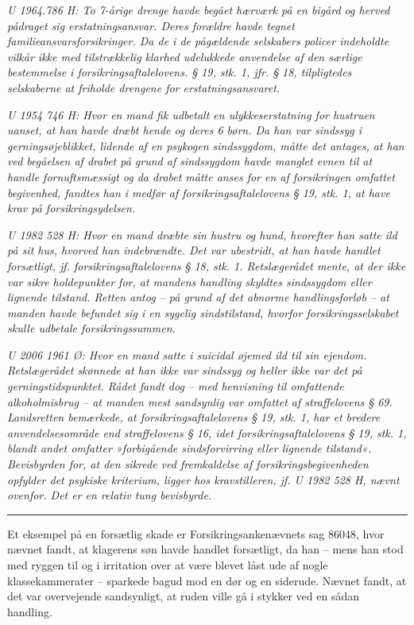 \documentclass[]{book}
\begin{document}
\emph{U 1964.786 H: To 7-årige drenge havde begået hærværk på en bigård og herved pådraget sig erstatningsansvar. Deres forældre havde tegnet familieansvarsforsikringer. Da de i de pågældende selskabers policer indeholdte vilkår ikke med tilstrækkelig klarhed udelukkede anvendelse af den særlige bestemmelse i forsikringsaftalelovens. § 19, stk. 1, jfr. § 18, tilpligtedes selskaberne at friholde drengene for erstatningsansvaret.}

\emph{U 1954 746 H: Hvor en mand fik udbetalt en ulykkeserstatning for hustruen uanset, at han havde dræbt hende og deres 6 børn. Da han var sindssyg i gerningsøjeblikket, lidende af en psykogen sindssygdom, måtte det antages, at han ved begåelsen af drabet på grund af sindssygdom havde manglet evnen til at handle fornuftsmæssigt og da drabet måtte anses for en af forsikringen omfattet begivenhed, fandtes han i medfør af forsikringsaftalelovens § 19, stk. 1, at have krav på forsikringsydelsen.}

\emph{U 1982 528 H: Hvor en mand dræbte sin hustru og hund, hvorefter han satte ild på sit hus, hvorved han indebrændte. Det var ubestridt, at han havde handlet forsætligt, jf. forsikringsaftalelovens § 18, stk. 1. Retslægerådet mente, at der ikke var sikre holdepunkter for, at mandens handling skyldtes sindssygdom eller lignende tilstand. Retten antog -- på grund af det abnorme handlingsforløb -- at manden havde befundet sig i en sygelig sindstilstand, hvorfor forsikringsselskabet skulle udbetale forsikringssummen.}

\emph{U 2006 1961 Ø: Hvor en mand satte i suicidal øjemed ild til sin ejendom. Retslægerådet skønnede at han ikke var sindssyg og heller ikke var det på gerningstidspunktet. Rådet fandt dog -- med henvisning til omfattende alkoholmisbrug -- at manden mest sandsynlig var omfattet af straffelovens § 69. Landsretten bemærkede, at forsikringsaftalelovens § 19, stk. 1, har et bredere anvendelsesområde end straffelovens § 16, idet forsikringsaftalelovens § 19, stk. 1, blandt andet omfatter »forbigående sindsforvirring eller lignende tilstand«. Bevisbyrden for, at den sikrede ved fremkaldelse af forsikringsbegivenheden opfylder det psykiske kriterium, ligger hos kravstilleren, jf. U 1982 528 H, nævnt ovenfor. Det er en relativ tung bevisbyrde.}

\begin{center}\rule{0.5\linewidth}{\linethickness}\end{center}

Et eksempel på en forsætlig skade er Forsikringsankenævnets sag 86048, hvor nævnet fandt, at klagerens søn havde handlet forsætligt, da han -- mens han stod med ryggen til og i irritation over at være blevet låst ude af nogle klassekammerater -- sparkede bagud mod en dør og en siderude. Nævnet fandt, at det var overvejende sandsynligt, at ruden ville gå i stykker ved en sådan handling.
\end{document}

